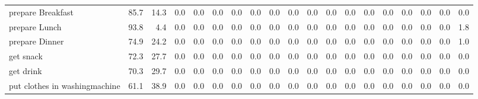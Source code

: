 \documentclass{article}
\begin{document}
\begin{sideways}
\begin{tabular}{lrrrrrrrrrrrrrrrrrr}
prepare Breakfast             &        85.7 &               14.3 &           0.0 &                          0.0 &                0.0 &                0.0 &                        0.0 &          0.0 &              0.0 &                0.0 &                    0.0 &                      0.0 &                  0.0 &                   0.0 &              0.0 &              0.0 &                                  0.0 &          0.0 \\
prepare Lunch                 &        93.8 &                4.4 &           0.0 &                          0.0 &                0.0 &                0.0 &                        0.0 &          0.0 &              0.0 &                0.0 &                    0.0 &                      0.0 &                  0.0 &                   0.0 &              0.0 &              0.0 &                                  0.0 &          1.8 \\
prepare Dinner                &        74.9 &               24.2 &           0.0 &                          0.0 &                0.0 &                0.0 &                        0.0 &          0.0 &              0.0 &                0.0 &                    0.0 &                      0.0 &                  0.0 &                   0.0 &              0.0 &              0.0 &                                  0.0 &          1.0 \\
get snack                     &        72.3 &               27.7 &           0.0 &                          0.0 &                0.0 &                0.0 &                        0.0 &          0.0 &              0.0 &                0.0 &                    0.0 &                      0.0 &                  0.0 &                   0.0 &              0.0 &              0.0 &                                  0.0 &          0.0 \\
get drink                     &        70.3 &               29.7 &           0.0 &                          0.0 &                0.0 &                0.0 &                        0.0 &          0.0 &              0.0 &                0.0 &                    0.0 &                      0.0 &                  0.0 &                   0.0 &              0.0 &              0.0 &                                  0.0 &          0.0 \\
put clothes in washingmachine &        61.1 &               38.9 &           0.0 &                          0.0 &                0.0 &                0.0 &                        0.0 &          0.0 &              0.0 &                0.0 &                    0.0 &                      0.0 &                  0.0 &                   0.0 &              0.0 &              0.0 &                                  0.0 &          0.0 \\

\end{tabular}
\end{sideways}
\end{document}
